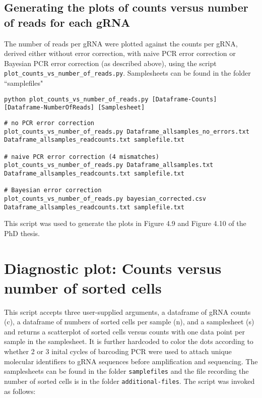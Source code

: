 \subsection{Generating the plots of counts versus number of reads for each gRNA}

The number of reads per gRNA were plotted against the counts per gRNA, derived either without error correction, with naive PCR error correction or Bayesian PCR error correction (as described above), using the script \verb|plot_counts_vs_number_of_reads.py|. Samplesheets can be found in the folder ``samplefiles"

\begin{small}\begin{lstlisting}
python plot_counts_vs_number_of_reads.py [Dataframe-Counts] [Dataframe-NumberOfReads] [Samplesheet]
\end{lstlisting}\end{small}

\begin{small}\begin{lstlisting}
# no PCR error correction
plot_counts_vs_number_of_reads.py Dataframe_allsamples_no_errors.txt Dataframe_allsamples_readcounts.txt samplefile.txt

# naive PCR error correction (4 mismatches)
plot_counts_vs_number_of_reads.py Dataframe_allsamples.txt Dataframe_allsamples_readcounts.txt samplefile.txt

# Bayesian error correction
plot_counts_vs_number_of_reads.py bayesian_corrected.csv Dataframe_allsamples_readcounts.txt samplefile.txt
\end{lstlisting}\end{small}

This script was used to generate the plots in Figure 4.9 and Figure 4.10 of the PhD thesis. 

\section{Diagnostic plot: Counts versus number of sorted cells}

This script accepts three user-supplied arguments, a dataframe of gRNA counts (c), a dataframe of numbers of sorted cells per sample (n), and a samplesheet (s) and returns a scatterplot of sorted cells versus counts with one data point per sample in the samplesheet. It is further hardcoded to color the dots according to whether 2 or 3 inital cycles of barcoding PCR were used to attach unique molecular identifiers to gRNA sequences before amplification and sequencing. The samplesheets can be found in the folder \verb|samplefiles| and the file recording the number of sorted cells is in the folder \verb|additional-files|. The script was invoked as follows:

